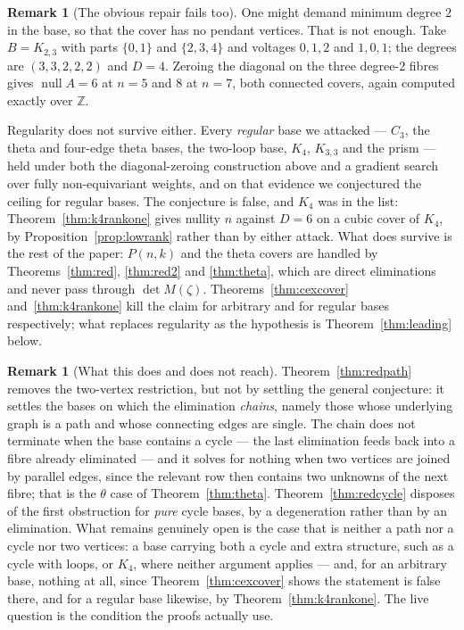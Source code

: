 \documentclass[11pt]{article}
\theoremstyle{definition}
\newtheorem{remark}[theorem]{Remark}
\begin{document}
\begin{remark}[The obvious repair fails too]\label{rem:mindeg}
One might demand minimum degree $2$ in the base, so that the cover has no
pendant vertices. That is not enough. Take $B=K_{2,3}$ with parts $\{0,1\}$ and
$\{2,3,4\}$ and voltages $0,1,2$ and $1,0,1$; the degrees are $(3,3,2,2,2)$ and
$D=4$. Zeroing the diagonal on the three degree-$2$ fibres gives
$\operatorname{null}A=6$ at $n=5$ and $8$ at $n=7$, both connected covers, again
computed exactly over $\mathbb Z$.

Regularity does not survive either. Every \emph{regular} base we attacked
--- $C_3$, the theta and four-edge theta bases, the two-loop base, $K_4$,
$K_{3,3}$ and the prism --- held under both the diagonal-zeroing construction
above and a gradient search over fully non-equivariant weights, and on that
evidence we conjectured the ceiling for regular bases. The conjecture is false,
and $K_4$ was in the list: Theorem~\ref{thm:k4rankone} gives nullity $n$
against $D=6$ on a cubic cover of $K_4$, by Proposition~\ref{prop:lowrank}
rather than by either attack. What does survive is the rest of the paper:
$P(n,k)$ and the theta covers are handled by Theorems~\ref{thm:red},
\ref{thm:red2} and \ref{thm:theta}, which are direct eliminations and never pass
through $\det M(\zeta)$. Theorems~\ref{thm:cexcover} and~\ref{thm:k4rankone}
kill the claim for arbitrary and for regular bases respectively; what replaces
regularity as the hypothesis is Theorem~\ref{thm:leading} below.
\end{remark}

\begin{remark}[What this does and does not reach]
Theorem~\ref{thm:redpath} removes the two-vertex restriction, but not by
settling the general conjecture: it settles the bases on which the elimination
\emph{chains}, namely those whose underlying graph is a path and whose
connecting edges are single. The chain does not terminate when the base contains a
cycle --- the last elimination feeds back into a fibre already eliminated --- and
it solves for nothing when two vertices are joined by parallel edges, since the
relevant row then contains two unknowns of the next fibre; that is the $\theta$
case of Theorem~\ref{thm:theta}. Theorem~\ref{thm:redcycle} disposes of the
first obstruction for \emph{pure} cycle bases, by a degeneration rather than by
an elimination. What remains genuinely open is the case that is neither a path
nor a cycle nor two vertices: a base carrying both a cycle and extra structure,
such as a cycle with loops, or $K_4$, where neither argument applies --- and,
for an arbitrary base, nothing at all, since Theorem~\ref{thm:cexcover} shows
the statement is false there, and for a regular base likewise, by
Theorem~\ref{thm:k4rankone}. The live question is the condition the proofs
actually use.
\end{remark}
\end{document}
